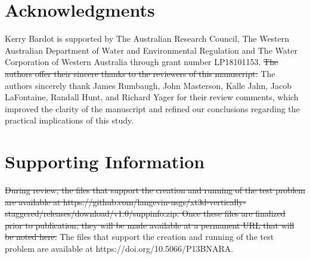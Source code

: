 \documentclass{article}
\begin{document}
\section*{Acknowledgments}
Kerry Bardot is supported by The Australian Research Council, The Western Australian Department of Water and Environmental Regulation and The Water Corporation of Western Australia through grant number LP18101153. {\color{red} \sout{The authors offer their sincere thanks to the reviewers of this manuscript. }The authors sincerely thank James Rumbaugh, John Masterson, Kalle Jahn, Jacob LaFontaine, Randall Hunt, and Richard Yager for their review comments, which improved the clarity of the manuscript and refined our conclusions regarding the practical implications of this study.}

\section*{Supporting Information}
{\color{red} \sout{During review, the files that support the creation and running of the test problem are available at https://github.com/langevin-usgs/xt3d-vertically-staggered/releases/download/v1.0/suppinfo.zip. Once these files are finalized prior to publication, they will be made available at a permanent URL that will be noted here.}}{\color{red} The files that support the creation and running of the test problem are available at https://doi.org/10.5066/P13BNARA.}




\end{document}
